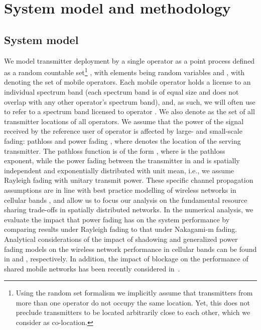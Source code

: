 \documentclass[12pt, journal,doublecolumn, final]{IEEEtran}
\begin{document}
\section{System model and methodology}

\subsection{System model}

We model transmitter deployment by a single operator as a point process defined as a random countable set\footnote{Using the random set formalism we implicitly assume that transmitters from more than one operator do not occupy the same location. Yet, this does not preclude transmitters to be located arbitrarily close to each other, which we consider as co-location.} , with elements being random variables  and , with  denoting the set of mobile operators. Each mobile operator holds a license to an individual spectrum band (each spectrum band is of equal size and does not overlap with any other operator's spectrum band), and, as such, we will often use  to refer to a spectrum band licensed to operator . We also denote  as the set of all transmitter locations of all operators. We assume that the power of the signal received by the reference user  of operator  is affected by large- and small-scale fading: pathloss  and power fading , where  denotes the location of the serving transmitter. The pathloss function  is of the form , where  is the pathloss exponent, while the power fading between the transmitter in  and  is spatially independent and exponentially distributed with unit mean, i.e., we assume Rayleigh fading with unitary transmit power. These specific channel propagation assumptions are in line with best practice modelling of wireless networks in cellular bands \cite{AndrewsGuptaDhillon_2016}, and allow us to focus our analysis on the fundamental resource sharing trade-offs in spatially distributed networks. In the numerical analysis, we evaluate the impact that power fading has on the system performance by comparing results under Rayleigh fading to that under Nakagami-m fading. Analytical considerations of the impact of shadowing and generalized power fading models on the wireless network performance in cellular bands can be found in \cite{GaliottoEtAl_2014} and \cite{DiRenzoGuidottiCorazza_2013}, respectively. In addition, the impact of blockage on the performance of shared mobile networks has been recently considered in~\cite{WangSamdanisPerezDiRenzo_2016}.
\end{document}
